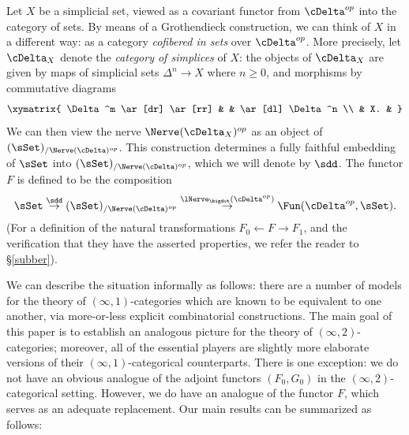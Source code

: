 \begin{remark}
Let $X$ be a simplicial set, viewed as a covariant functor from
$\cDelta^{op}$ into the category of sets. By means of a Grothendieck construction,
we can think of $X$ in a different way: as a category {\it cofibered in sets} over
$\cDelta^{op}$. More precisely, let $\cDelta_{X}$ denote the {\it category of simplices}
of $X$: the objects of $\cDelta_{X}$ are given by maps of simplicial sets $\Delta^n \rightarrow X$
where $n \geq 0$, and morphisms by commutative diagrams
$$ \xymatrix{ \Delta^m \ar[dr] \ar[rr] & & \ar[dl] \Delta^n \\
& X. & }$$
We can then view the nerve $\Nerve( \cDelta_{X})^{op}$ as an object of
$(\sSet)_{/ \Nerve(\cDelta)^{op}}$. This construction determines a fully faithful embedding
of $\sSet$ into $(\sSet)_{/ \Nerve(\cDelta)^{op}}$, which we will denote by $\sdd$.
The functor $F$ is defined to be the composition
$$\sSet \stackrel{\sdd}{\rightarrow} 
(\sSet)_{/ \Nerve(\cDelta)^{op} } \stackrel{ \lNerve_{\bigdot}(\cDelta^{op})}{\rightarrow}
\Fun( \cDelta^{op}, \sSet).$$
(For a definition of the natural transformations $F_0 \leftarrow F \rightarrow F_1$,
and the verification that they have the asserted properties, we refer the reader to
\S \ref{subber}). 
\end{remark}

We can describe the situation informally as follows: there are a number of models
for the theory of $(\infty,1)$-categories which are known to be equivalent to one another,
via more-or-less explicit combinatorial constructions. The main goal of this paper is to establish
an analogous picture for the theory of $(\infty,2)$-categories; moreover, all of the essential
players are slightly more elaborate versions of their $(\infty,1)$-categorical counterparts.
There is one exception: we do not have an obvious analogue of the adjoint functors
$(F_0,G_0)$ in the $(\infty,2)$-categorical setting. However, we do have an analogue of the functor
$F$, which serves as an adequate replacement. Our main results can be summarized as follows:

